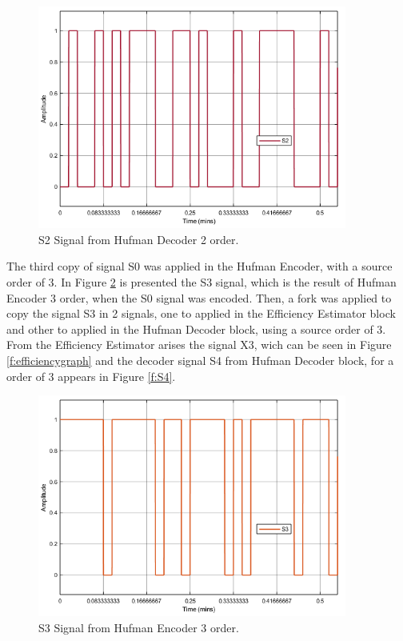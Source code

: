 \begin{refsection}
\begin{figure}[!h]
\centering
\includegraphics[width=4in]{./sdf/eit_45550_estimator_source_code_efficiency/figures/S2.png}
\caption[S2 Signal from Hufman Decoder 2 order.]{S2 Signal from Hufman Decoder 2 order.}
\label{f:S2}
\end{figure}

The third copy of signal S0 was applied in the Hufman Encoder, with a source order of 3. In Figure \ref{f:S3} is presented the S3 signal, which is the result of Hufman Encoder 3 order, when the S0 signal was encoded.
Then, a fork was applied to copy the signal S3 in 2 signals, one to applied in the Efficiency Estimator block and other to applied in the Hufman Decoder block, using a source order of 3.
From the Efficiency Estimator arises the signal X3, wich can be seen in Figure \ref{f:efficiencygraph} and the decoder signal S4 from Hufman Decoder block, for a order of 3 appears in Figure \ref{f:S4}. 

\begin{figure}[!h]
\centering
\includegraphics[width=4in]{./sdf/eit_45550_estimator_source_code_efficiency/figures/S3.png}
\caption[S3 Signal from Hufman Encoder 3 order.]{S3 Signal from Hufman Encoder 3 order.}
\label{f:S3}
\end{figure}



\end{refsection}
